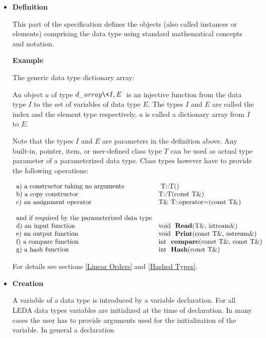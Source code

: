 \begin{itemize}
\item{\bf Definition}

\smallskip
This part of the specification defines the objects (also called instances or
elements) comprising the data type using standard mathematical concepts and 
notation. 

{\bf Example}

The generic data type dictionary array:

An object $a$ of type $d\_array\<I,E\>$ is an injective function from the
data type $I$ to the set of variables of data type $E$. The types $I$ and
$E$ are called the index and the element type respectively, $a$ is called
a dictionary array from $I$ to $E$.

Note that the types $I$ and $E$ are parameters in the definition above.
Any built-in, pointer, item, or user-defined class type $T$ can be used 
as actual type parameter of a parameterized data type. Class types however 
have to provide the following operations:

\[
\begin{array}{ll}
\mbox{a) a constructor taking no arguments} &\mbox{ T::T()} \\
\mbox{b) a copy constructor}     &\mbox{T::T(const T\&)} \\
\mbox{c) an assignment operator} &\mbox{T\&\ T::operator=(const T\&)} \\
\\
\mbox{and if required by the parameterized data type}\\
\mbox{d) an input function}  &\mbox{void \ {\bf Read}(T\&,\ istream\&)}\\
\mbox{e) an output function} &\mbox{void \ {\bf Print}(const T\&,\ ostream\&)}\\
\mbox{f) a compare function} &\mbox{int \ {\bf compare}(const T\&, const T\&)}\\
\mbox{g) a hash function}    &\mbox{int \ {\bf Hash}(const T\&)}\\
\end{array}
\]


For details see sections \ref{Linear Orders} and \ref{Hashed Types}.


\item {\bf Creation}

\smallskip
A variable of a data type is introduced by a \CC variable declaration. 
For all LEDA data types variables are initialized at the time of declaration. 
In many cases the user has to provide arguments used for the initialization 
of the variable.  In general a declaration


\end{itemize}
